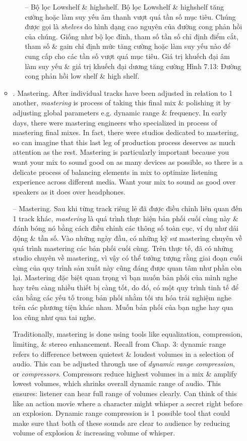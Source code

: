 \documentclass{article}
\begin{document}
\begin{itemize}
\begin{itemize}
\begin{itemize}
			-- {\sf Bộ lọc Lowshelf \& highshelf.} Bộ lọc Lowshelf \& highshelf tăng cường hoặc làm suy yếu âm thanh vượt quá tần số mục tiêu. Chúng được gọi là {\it shelves} do hình dạng cao nguyên của đường cong phản hồi của chúng. Giống như bộ lọc đỉnh, tham số tần số chỉ định điểm cắt, tham số \& gain chỉ định mức tăng cường hoặc làm suy yếu nào để cung cấp cho các tần số vượt quá mục tiêu. Giá trị khuếch đại âm làm suy yếu \& giá trị khuếch đại dương tăng cường {\sf Hình 7.13: Đường cong phản hồi low shelf \& high shelf.}
		\end{itemize}
		\item {. Mastering.} After individual tracks have been adjusted in relation to 1 another, {\it mastering} is process of taking this final mix \& polishing it by adjusting global parameters e.g. dynamic range \& frequency. In early days, there were mastering engineers who specialized in process of mastering final mixes. In fact, there were studios dedicated to mastering, so can imagine that this last leg of production process deserves as much attention as the rest. Mastering is particularly important because you want your mix to sound good on as many devices as possible, so there is a delicate process of balancing elements in mix to optimize listening experience across different media. Want your mix to sound as good over speakers as it does over headphones.
		
		-- {\sf Mastering.} Sau khi từng track riêng lẻ đã được điều chỉnh liên quan đến 1 track khác, {\it mastering} là quá trình thực hiện bản phối cuối cùng này \& đánh bóng nó bằng cách điều chỉnh các thông số toàn cục, ví dụ như dải động \& tần số. Vào những ngày đầu, có những kỹ sư mastering chuyên về quá trình mastering các bản phối cuối cùng. Trên thực tế, đã có những studio chuyên về mastering, vì vậy có thể tưởng tượng rằng giai đoạn cuối cùng của quy trình sản xuất này cũng đáng được quan tâm như phần còn lại. Mastering đặc biệt quan trọng vì bạn muốn bản phối của mình nghe hay trên càng nhiều thiết bị càng tốt, do đó, có một quy trình tinh tế để cân bằng các yếu tố trong bản phối nhằm tối ưu hóa trải nghiệm nghe trên các phương tiện khác nhau. Muốn bản phối của bạn nghe hay qua loa cũng như qua tai nghe.
		
		Traditionally, mastering is done using tools like equalization, compression, limiting, \& stereo enhancement. Recall from Chap. 3: dynamic range refers to difference between quietest \& loudest volumes in a selection of audio. This can be adjusted through use of {\it dynamic range compression}, or {\it compressors}. Compressors reduce highest volumes in a mix \& amplify lowest volumes, which shrinks overall dynamic range of audio. This ensures: listener can hear full range of volumes clearly. Can think of this like an action movie where a character might whisper a secret right before an explosion. Dynamic range compression is 1 possible tool that could make sure that both of these sounds are clear to audience by reducing volume of explosion \& increasing volume of whisper.
		

\end{itemize}
\end{itemize}
\end{document}

